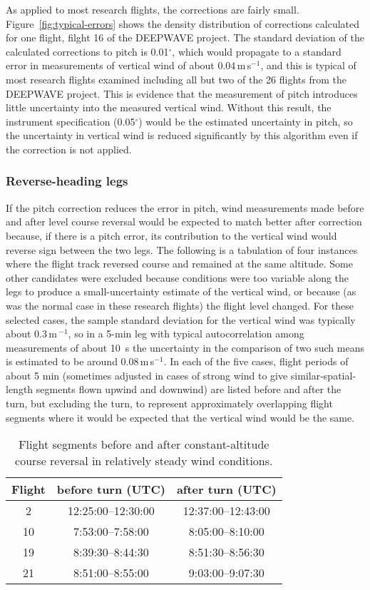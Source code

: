 \documentclass[english,british,amt,bookmarks=false,unicode=true]{copernicus}\usepackage[]{graphicx}\usepackage[]{color}
\providecommand{\tabularnewline}{\\}
\begin{document}
As applied to most research flights, the corrections are fairly small.
Figure~\ref{fig:typical-errors} shows the density distribution of
corrections calculated for one flight, filght 16 of the DEEPWAVE project.
The standard deviation of the calculated corrections to pitch is 0.01$^{\circ}$,
which would propagate to a standard error in measurements of vertical
wind of about 0.04\,m\,s$^{-1}$,
and this is typical of most research flights examined including all
but two of the 26 flights from the DEEPWAVE project. This is evidence
that the measurement of pitch introduces little uncertainty into the
measured vertical wind. Without this result, the instrument specification
(0.05$^{\circ}$) would be the estimated uncertainty in pitch, so
the uncertainty in vertical wind is reduced significantly by this
algorithm even if the correction is not applied. 


\subsubsection{Reverse-heading legs}

If the pitch correction reduces the error in pitch, wind measurements
made before and after level course reversal would be expected to match
better after correction because, if there is a pitch error, its contribution
to the vertical wind would reverse sign between the two legs. The
following is a tabulation of four instances where the flight track
reversed course and remained at the same altitude. Some other candidates
were excluded because conditions were too variable along the legs
to produce a small-uncertainty estimate of the vertical wind, or because
(as was the normal case in these research flights) the flight level
changed. For these selected cases, the sample standard deviation for
the vertical wind was typically about 0.3\,m\,$^{-1}$, so in a
5-min leg with typical autocorrelation among measurements of about
10~s the uncertainty in the comparison of two such means is estimated
to be around 0.08\,m\,s$^{-1}$. In each of the five cases, flight
periods of about 5 min (sometimes adjusted in cases of strong wind
to give similar-spatial-length segments flown upwind and downwind)
are listed before and after the turn, but excluding the turn, to represent
approximately overlapping flight segments where it would be expected
that the vertical wind would be the same. 

\begin{table}
\caption{Flight segments before and after constant-altitude course reversal
in relatively steady wind conditions.}


\centering{}%
\begin{tabular}{|c|c|c|}
\hline 
\textbf{Flight} &
\textbf{before turn (UTC)} &
\textbf{after turn (UTC)}\tabularnewline
\hline 
\hline 
2 &
12:25:00--12:30:00 &
12:37:00--12:43:00\tabularnewline
\hline 
10 &
7:53:00--7:58:00 &
8:05:00--8:10:00\tabularnewline
\hline 
19 &
8:39:30--8:44:30 &
8:51:30--8:56:30\tabularnewline
\hline 
21 &
8:51:00--8:55:00 &
9:03:00--9:07:30\tabularnewline
\hline 
\end{tabular}
\end{table}
\end{document}
